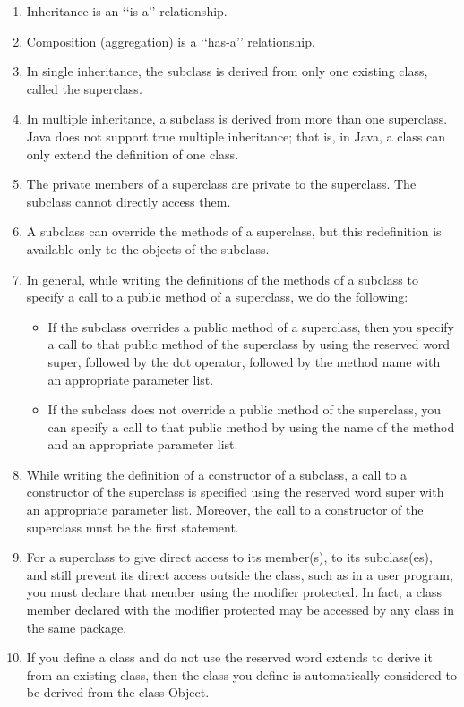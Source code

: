 \documentclass[12pt,a4paper,final,twoside,onecolumn,titlepage]{book}
\begin{document}
\begin{enumerate}
\item Inheritance is an ‘‘is-a’’ relationship.
\item Composition (aggregation) is a ‘‘has-a’’ relationship.
\item In single inheritance, the subclass is derived from only one existing class, called the superclass.
\item In multiple inheritance, a subclass is derived from more than one superclass. Java does not support true multiple inheritance; that is, in Java, a class can only extend the definition of one class.
\item The private members of a superclass are private to the superclass. The subclass cannot directly access them.
\item A subclass can override the methods of a superclass, but this redefinition is available only to the objects of the subclass.
\item In general, while writing the definitions of the methods of a subclass to specify a call to a public method of a superclass, we do the following:
\begin{itemize}
\item If the subclass overrides a public method of a superclass, then you specify a call to that public method of the superclass by using the reserved word super, followed by the dot operator, followed by the method name with an appropriate parameter list.
\item If the subclass does not override a public method of the superclass, you can specify a call to that public method by using the name of the method and an appropriate parameter list.
\end{itemize}
\item While writing the definition of a constructor of a subclass, a call to a constructor of the superclass is specified using the reserved word super with an appropriate parameter list. Moreover, the call to a constructor of the superclass must be the first statement.
\item For a superclass to give direct access to its member(s), to its subclass(es), and still prevent its direct access outside the class, such as in a user program, you must declare that member using the modifier protected. In fact, a class member declared with the modifier protected may be accessed by any class in the same package.
\item If you define a class and do not use the reserved word extends to derive it from an existing class, then the class you define is automatically considered to be derived from the class Object.

\end{enumerate}
\end{document}
